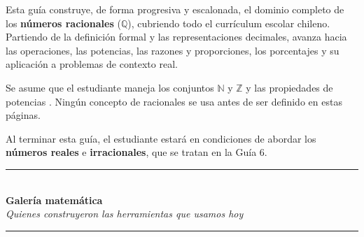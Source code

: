 \documentclass[11pt, letterpaper]{article}
\begin{document}
\begin{tcolorbox}[importantbox, title={Prop\'osito de la gu\'ia}]
Esta gu\'ia construye, de forma progresiva y escalonada, el dominio completo de los \textbf{n\'umeros racionales} ($\mathbb{Q}$), cubriendo todo el curr\'iculum escolar chileno. Partiendo de la definici\'on formal y las representaciones decimales, avanza hacia las operaciones, las potencias, las razones y proporciones, los porcentajes y su aplicaci\'on a problemas de contexto real.

\medskip

Se asume que el estudiante maneja los conjuntos $\mathbb{N}$ y $\mathbb{Z}$  y las propiedades de potencias . Ning\'un concepto de racionales se usa antes de ser definido en estas p\'aginas.

\medskip

Al terminar esta gu\'ia, el estudiante estar\'a en condiciones de abordar los \textbf{n\'umeros reales} e \textbf{irracionales}, que se tratan en la Gu\'ia 6.
\end{tcolorbox}

\clearpage
\thispagestyle{empty}
\label{sec:galeria}

\begin{center}
  \vspace*{0.4cm}
  \textcolor{zenitnavy}{\rule{0.72\linewidth}{1.2pt}}\\[0.5cm]
  {\Large\bfseries\color{zenitnavy} Galer\'ia matem\'atica}\\[0.15cm]
  {\normalsize\itshape\color{zenitgold} Quienes construyeron las herramientas que usamos hoy}\\[0.4cm]
  \textcolor{zenitnavy}{\rule{0.72\linewidth}{0.6pt}}
\end{center}

\vspace{0.6cm}
\end{document}
